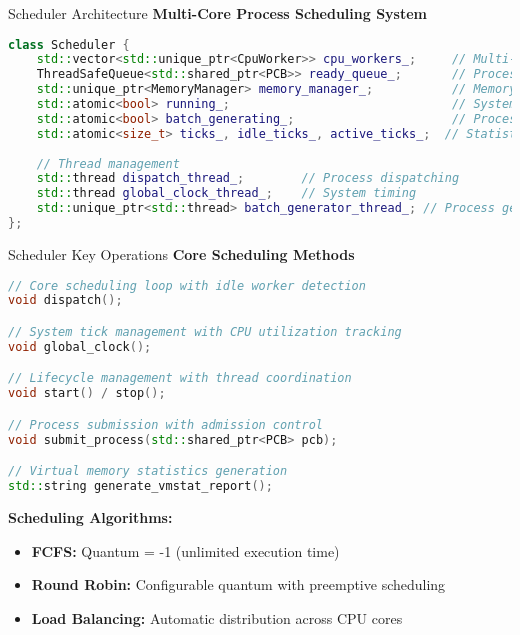 \documentclass[10pt]{beamer}
\begin{document}
\begin{frame}[fragile]{Scheduler Architecture}
    \textbf{Multi-Core Process Scheduling System}
    \begin{lstlisting}[language=C++]
class Scheduler {
    std::vector<std::unique_ptr<CpuWorker>> cpu_workers_;     // Multi-core
    ThreadSafeQueue<std::shared_ptr<PCB>> ready_queue_;       // Process queue
    std::unique_ptr<MemoryManager> memory_manager_;           // Memory system
    std::atomic<bool> running_;                               // System state
    std::atomic<bool> batch_generating_;                      // Process gen
    std::atomic<size_t> ticks_, idle_ticks_, active_ticks_;  // Statistics
    
    // Thread management
    std::thread dispatch_thread_;        // Process dispatching
    std::thread global_clock_thread_;    // System timing
    std::unique_ptr<std::thread> batch_generator_thread_; // Process gen
};
    \end{lstlisting}
\end{frame}

\begin{frame}[fragile]{Scheduler Key Operations}
    \textbf{Core Scheduling Methods}
    \begin{lstlisting}[language=C++]
// Core scheduling loop with idle worker detection
void dispatch();

// System tick management with CPU utilization tracking
void global_clock();

// Lifecycle management with thread coordination
void start() / stop();

// Process submission with admission control
void submit_process(std::shared_ptr<PCB> pcb);

// Virtual memory statistics generation
std::string generate_vmstat_report();
    \end{lstlisting}
    
    \vspace{0.3cm}
    \textbf{Scheduling Algorithms:}
    \begin{itemize}
        \item \textbf{FCFS:} Quantum = -1 (unlimited execution time)
        \item \textbf{Round Robin:} Configurable quantum with preemptive scheduling
        \item \textbf{Load Balancing:} Automatic distribution across CPU cores
    \end{itemize}
\end{frame}
\end{document}
